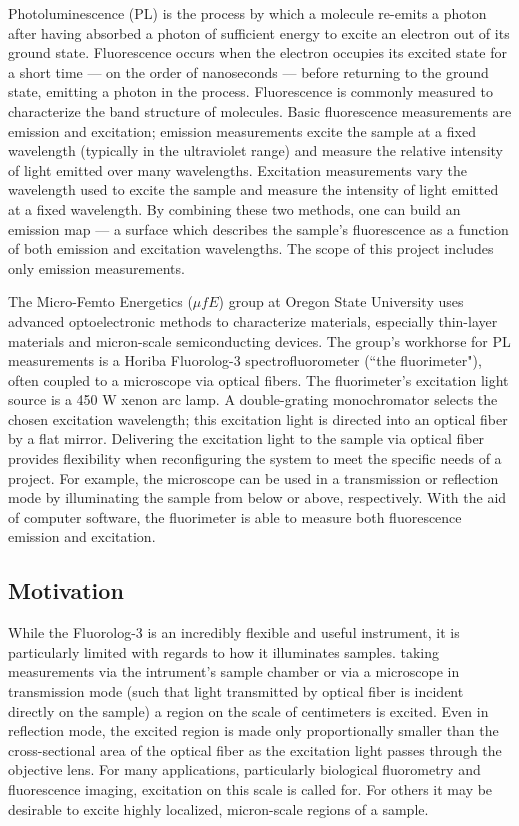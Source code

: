 Photoluminescence (PL) is the process by which a molecule re-emits a photon after having absorbed a photon of sufficient energy to excite an electron out of its ground state. Fluorescence occurs when the electron occupies its excited state for a short time  --- on the order of nanoseconds --- before returning to the ground state, emitting a photon in the process. Fluorescence is commonly measured to characterize the band structure of molecules. Basic fluorescence measurements are emission and excitation; emission measurements excite the sample at a fixed wavelength (typically in the ultraviolet range) and measure the relative intensity of light emitted over many wavelengths. Excitation measurements vary the wavelength used to excite the sample and measure the intensity of light emitted at a fixed wavelength. By combining these two methods, one can build an emission map --- a surface which describes the sample's fluorescence as a function of both emission and excitation wavelengths. The scope of this project includes only emission measurements.

The Micro-Femto Energetics ($\mu fE$) group at Oregon State University uses advanced optoelectronic methods to characterize materials, especially thin-layer materials and micron-scale semiconducting devices. The group's workhorse for PL measurements is a Horiba Fluorolog-3 spectrofluorometer (``the fluorimeter"), often coupled to a microscope via optical fibers. The fluorimeter's excitation light source is a 450 W xenon arc lamp. A double-grating monochromator selects the chosen excitation wavelength; this excitation light is directed into an optical fiber by a flat mirror. Delivering the excitation light to the sample via optical fiber provides flexibility when reconfiguring the system to meet the specific needs of a project. For example, the microscope can be used in a transmission or reflection mode by illuminating the sample from below or above, respectively. With the aid of computer software, the fluorimeter is able to measure both fluorescence emission and excitation.

\subsection{Motivation}
While the Fluorolog-3 is an incredibly flexible and useful instrument, it is particularly limited with regards to how it illuminates samples. \When taking measurements via the intrument's sample chamber or via a microscope in transmission mode (such that light transmitted by optical fiber is incident directly on the sample) a region on the scale of centimeters is excited. Even in reflection mode, the excited region is made only proportionally smaller than the cross-sectional area of the optical fiber as the excitation light passes through the objective lens. For many applications, particularly biological fluorometry and fluorescence imaging, excitation on this scale is called for. For others it may be desirable to excite highly localized, micron-scale regions of a sample.

